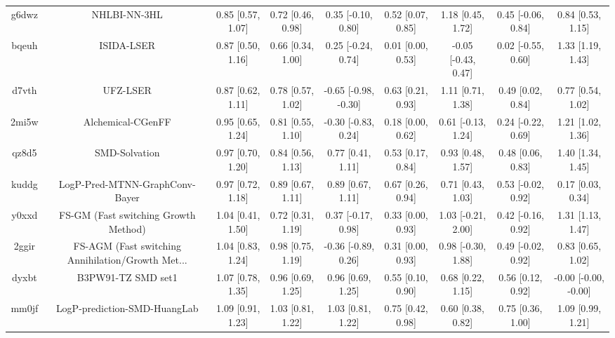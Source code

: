 \documentclass{article}
\begin{document}
\begin{center}
\begin{longtable}{|ccccccccc|}
 g6dwz &                                       NHLBI-NN-3HL &  0.85 [0.57, 1.07] &  0.72 [0.46, 0.98] &    0.35 [-0.10, 0.80] &  0.52 [0.07, 0.85] &    1.18 [0.45, 1.72] &   0.45 [-0.06, 0.84] &     0.84 [0.53, 1.15] \\
 bqeuh &                                         ISIDA-LSER &  0.87 [0.50, 1.16] &  0.66 [0.34, 1.00] &    0.25 [-0.24, 0.74] &  0.01 [0.00, 0.53] &  -0.05 [-0.43, 0.47] &   0.02 [-0.55, 0.60] &     1.33 [1.19, 1.43] \\
 d7vth &                                           UFZ-LSER &  0.87 [0.62, 1.11] &  0.78 [0.57, 1.02] &  -0.65 [-0.98, -0.30] &  0.63 [0.21, 0.93] &    1.11 [0.71, 1.38] &    0.49 [0.02, 0.84] &     0.77 [0.54, 1.02] \\
 2mi5w &                                  Alchemical-CGenFF &  0.95 [0.65, 1.24] &  0.81 [0.55, 1.10] &   -0.30 [-0.83, 0.24] &  0.18 [0.00, 0.62] &   0.61 [-0.13, 1.24] &   0.24 [-0.22, 0.69] &     1.21 [1.02, 1.36] \\
 qz8d5 &                                      SMD-Solvation &  0.97 [0.70, 1.20] &  0.84 [0.56, 1.13] &     0.77 [0.41, 1.11] &  0.53 [0.17, 0.84] &    0.93 [0.48, 1.57] &    0.48 [0.06, 0.83] &     1.40 [1.34, 1.45] \\
 kuddg &                     LogP-Pred-MTNN-GraphConv-Bayer &  0.97 [0.72, 1.18] &  0.89 [0.67, 1.11] &     0.89 [0.67, 1.11] &  0.67 [0.26, 0.94] &    0.71 [0.43, 1.03] &   0.53 [-0.02, 0.92] &     0.17 [0.03, 0.34] \\
 y0xxd &               FS-GM (Fast switching Growth Method) &  1.04 [0.41, 1.50] &  0.72 [0.31, 1.19] &    0.37 [-0.17, 0.98] &  0.33 [0.00, 0.93] &   1.03 [-0.21, 2.00] &   0.42 [-0.16, 0.92] &     1.31 [1.13, 1.47] \\
 2ggir &  FS-AGM (Fast switching Annihilation/Growth Met... &  1.04 [0.83, 1.24] &  0.98 [0.75, 1.19] &   -0.36 [-0.89, 0.26] &  0.31 [0.00, 0.93] &   0.98 [-0.30, 1.88] &   0.49 [-0.02, 0.92] &     0.83 [0.65, 1.02] \\
 dyxbt &                                 B3PW91-TZ SMD set1 &  1.07 [0.78, 1.35] &  0.96 [0.69, 1.25] &     0.96 [0.69, 1.25] &  0.55 [0.10, 0.90] &    0.68 [0.22, 1.15] &    0.56 [0.12, 0.92] &  -0.00 [-0.00, -0.00] \\
 mm0jf &                       LogP-prediction-SMD-HuangLab &  1.09 [0.91, 1.23] &  1.03 [0.81, 1.22] &     1.03 [0.81, 1.22] &  0.75 [0.42, 0.98] &    0.60 [0.38, 0.82] &    0.75 [0.36, 1.00] &     1.09 [0.99, 1.21] \\

\end{longtable}
\end{center}
\end{document}
